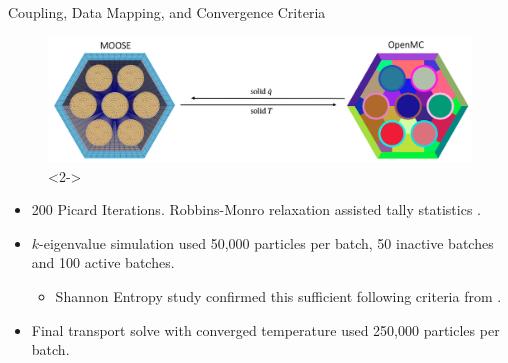 \documentclass[9pt,t]{beamer}
\begin{document}
\begin{frame}{Coupling, Data Mapping, and Convergence Criteria}
    \pause
    \begin{figure}[T]
        \centering
        \includegraphics[width=\linewidth]{figures/cardinal_solid.png}<2->
    \end{figure}
    \begin{itemize}
        \item<3-> 200 Picard Iterations. Robbins-Monro relaxation assisted tally statistics \cite{dufek}.
        \item<4-> $k$-eigenvalue simulation used 50,000 particles per batch, 50 inactive batches and 100 active batches.
        \begin{itemize}
            \item<5-> Shannon Entropy study confirmed this sufficient following criteria from \cite{brown-entropy-2006}.
        \end{itemize}
        \item<6-> Final transport solve with converged temperature used 250,000 particles per batch.
    \end{itemize}
\end{frame}


\end{document}
